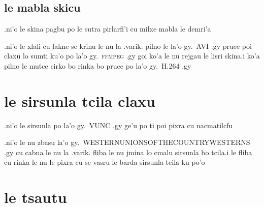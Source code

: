 \documentclass{report}
\begin{document}
\subsection{le mabla skicu}
.ni'o le skina pagbu po le sutra pirlarfi'i cu milxe mabla le demri'a

.ni'o le xlali cu lakne se krinu le nu la .varik. pilno le la'o gy.\ AVI .gy pruce poi claxu lo sumti ku'o po la'o gy.\ \textsc{ffmpeg} .gy goi ko'a le nu rejgau le lisri skina\@  .i ko'a pilno le mutce cirko bo rinka bo pruce po la'o gy.\ H.264 .gy
\section{le sirsunla tcila claxu}
.ni'o le sirsunla po la'o gy.\ VUNC .gy ge'u po ti poi pixra cu nacmatilcfu

.ni'o le nu zbasu la'o gy.\ WESTERNUNIONSOFTHECOUNTRYWESTERNS .gy cu cabna le nu la .varik. fliba le nu jmina lo cmalu sirsunla bo tcila\@  .i le fliba cu rinka le nu le pixra cu se vasru le barda sirsunla tcila ku po'o
\section{le tsautu}
\end{document}
